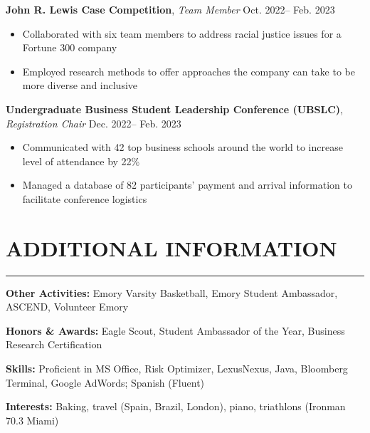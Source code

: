 \documentclass[10.5pt]{article}
\begin{document}
\noindent
\textbf{John R. Lewis Case Competition}, \emph{Team Member} \hfill Oct. 2022-- Feb. 2023
\begin{itemize}[itemsep=0pt]
    \item Collaborated with six team members to address racial justice issues for a Fortune 300 company
    \item Employed research methods to offer approaches the company can take to be more diverse and inclusive
\end{itemize}

\noindent
\textbf{Undergraduate Business Student Leadership Conference (UBSLC)}, \emph{Registration Chair} \hfill Dec. 2022-- Feb. 2023
\begin{itemize}[itemsep=0pt]
    \item Communicated with 42 top business schools around the world to increase level of attendance by 22\%
    \item Managed a database of 82 participants' payment and arrival information to facilitate conference logistics
\end{itemize}

\section*{\large\textbf{ADDITIONAL INFORMATION}}
\vspace{-\baselineskip}
\noindent\rule{\textwidth}{0.4pt}

\noindent
\textbf{Other Activities:} Emory Varsity Basketball, Emory Student Ambassador, ASCEND, Volunteer Emory

\noindent
\textbf{Honors \& Awards:} Eagle Scout, Student Ambassador of the Year, Business Research Certification

\noindent
\textbf{Skills:} Proficient in MS Office, Risk Optimizer, LexusNexus, Java, Bloomberg Terminal, Google AdWords; Spanish (Fluent)

\noindent
\textbf{Interests:} Baking, travel (Spain, Brazil, London), piano, triathlons (Ironman 70.3 Miami)
\end{document}
